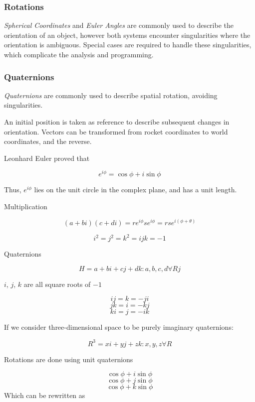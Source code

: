\documentclass[]{article}
\begin{document}
\clearpage

\subsubsection{Rotations}\label{rotations}

\emph{Spherical Coordinates} and \emph{Euler Angles} are commonly used
to describe the orientation of an object, however both systems encounter
singularities where the orientation is ambiguous. Special cases are
required to handle these singularities, which complicate the analysis
and programming.

\subsubsection{Quaternions}\label{quaternions}

\emph{Quaternions} are commonly used to describe spatial rotation,
avoiding singularities.

An initial position is taken as reference to describe subsequent changes
in orientation. Vectors can be transformed from rocket coordinates to
world coordinates, and the reverse.

Leonhard Euler proved that

\begin{equation}
\label{eq_euler_mult}
e^{i\phi} = \cos \phi + i \sin \phi
\end{equation}

Thus, \(e^{i\phi}\) lies on the unit circle in the complex plane, and
has a unit length.

Multiplication

\[
(a+bi)(c+di) = re^{i\phi}se^{i\phi} = rse^{i(\phi + \theta)}
\]

\[
i^2 = j^2 = k^2 = ijk = -1
\]

Quaternions

\[
H = { a + bi + cj + dk : a,b,c,d \forall R }j
\]

\(i\), \(j\), \(k\) are all square roots of \(-1\)

\[
ij = k = -ji 
\] \[
jk = i = -kj 
\] \[
ki = j = -ik
\]

If we consider three-dimensional space to be purely imaginary
quaternions:

\[
R^3 = {xi + yj + zk : x,y,z \forall R}
\]

Rotations are done using unit quaternions

\[
\cos \phi + i \sin \phi 
\] \[
\cos \phi + j \sin \phi 
\] \[
\cos \phi + k \sin \phi
\] Which can be rewritten as
\end{document}
